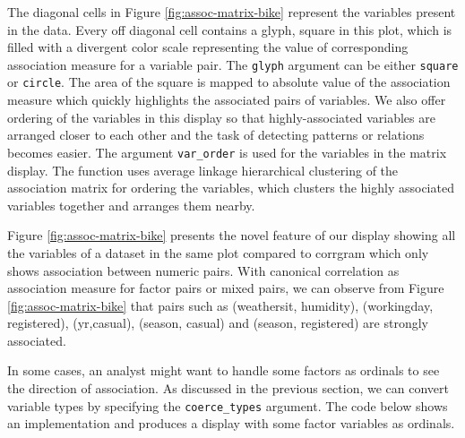 The diagonal cells in Figure \ref{fig:assoc-matrix-bike} represent the
variables present in the data. Every off diagonal cell contains a glyph,
square in this plot, which is filled with a divergent color scale
representing the value of corresponding association measure for a
variable pair. The \texttt{glyph} argument can be either \texttt{square}
or \texttt{circle}. The area of the square is mapped to absolute value
of the association measure which quickly highlights the associated pairs
of variables. We also offer ordering of the variables in this display so
that highly-associated variables are arranged closer to each other and
the task of detecting patterns or relations becomes easier. The argument
\texttt{var\_order} is used for the variables in the matrix display. The
function uses average linkage hierarchical clustering of the association
matrix for ordering the variables, which clusters the highly associated
variables together and arranges them nearby.

Figure \ref{fig:assoc-matrix-bike} presents the novel feature of our
display showing all the variables of a dataset in the same plot compared
to corrgram which only shows association between numeric pairs. With
canonical correlation as association measure for factor pairs or mixed
pairs, we can observe from Figure \ref{fig:assoc-matrix-bike} that pairs
such as (weathersit, humidity), (workingday, registered), (yr,casual),
(season, casual) and (season, registered) are strongly associated.

In some cases, an analyst might want to handle some factors as ordinals
to see the direction of association. As discussed in the previous
section, we can convert variable types by specifying the
\texttt{coerce\_types} argument. The code below shows an implementation
and produces a display with some factor variables as ordinals.

